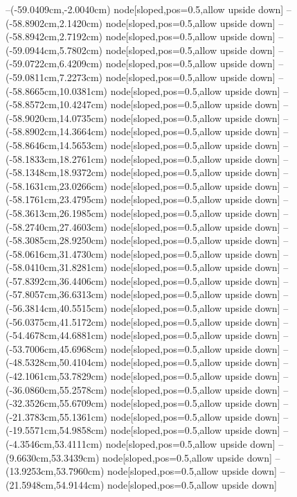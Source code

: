 --(-59.0409cm,-2.0040cm) node[sloped,pos=0.5,allow upside down]{\arrowIn}
--(-58.8902cm,2.1420cm) node[sloped,pos=0.5,allow upside down]{\ArrowIn}
--(-58.8942cm,2.7192cm) node[sloped,pos=0.5,allow upside down]{\arrowIn}
--(-59.0944cm,5.7802cm) node[sloped,pos=0.5,allow upside down]{\ArrowIn}
--(-59.0722cm,6.4209cm) node[sloped,pos=0.5,allow upside down]{\arrowIn}
--(-59.0811cm,7.2273cm) node[sloped,pos=0.5,allow upside down]{\arrowIn}
--(-58.8665cm,10.0381cm) node[sloped,pos=0.5,allow upside down]{\ArrowIn}
--(-58.8572cm,10.4247cm) node[sloped,pos=0.5,allow upside down]{\arrowIn}
--(-58.9020cm,14.0735cm) node[sloped,pos=0.5,allow upside down]{\ArrowIn}
--(-58.8902cm,14.3664cm) node[sloped,pos=0.5,allow upside down]{\arrowIn}
--(-58.8646cm,14.5653cm) node[sloped,pos=0.5,allow upside down]{\arrowIn}
--(-58.1833cm,18.2761cm) node[sloped,pos=0.5,allow upside down]{\ArrowIn}
--(-58.1348cm,18.9372cm) node[sloped,pos=0.5,allow upside down]{\arrowIn}
--(-58.1631cm,23.0266cm) node[sloped,pos=0.5,allow upside down]{\ArrowIn}
--(-58.1761cm,23.4795cm) node[sloped,pos=0.5,allow upside down]{\arrowIn}
--(-58.3613cm,26.1985cm) node[sloped,pos=0.5,allow upside down]{\ArrowIn}
--(-58.2740cm,27.4603cm) node[sloped,pos=0.5,allow upside down]{\ArrowIn}
--(-58.3085cm,28.9250cm) node[sloped,pos=0.5,allow upside down]{\ArrowIn}
--(-58.0616cm,31.4730cm) node[sloped,pos=0.5,allow upside down]{\ArrowIn}
--(-58.0410cm,31.8281cm) node[sloped,pos=0.5,allow upside down]{\arrowIn}
--(-57.8392cm,36.4406cm) node[sloped,pos=0.5,allow upside down]{\ArrowIn}
--(-57.8057cm,36.6313cm) node[sloped,pos=0.5,allow upside down]{\arrowIn}
--(-56.3814cm,40.5515cm) node[sloped,pos=0.5,allow upside down]{\ArrowIn}
--(-56.0375cm,41.5172cm) node[sloped,pos=0.5,allow upside down]{\ArrowIn}
--(-54.4678cm,44.6881cm) node[sloped,pos=0.5,allow upside down]{\ArrowIn}
--(-53.7006cm,45.6968cm) node[sloped,pos=0.5,allow upside down]{\ArrowIn}
--(-48.5328cm,50.4104cm) node[sloped,pos=0.5,allow upside down]{\ArrowIn}
--(-42.1061cm,53.7829cm) node[sloped,pos=0.5,allow upside down]{\ArrowIn}
--(-36.0860cm,55.2578cm) node[sloped,pos=0.5,allow upside down]{\ArrowIn}
--(-32.3526cm,55.6709cm) node[sloped,pos=0.5,allow upside down]{\ArrowIn}
--(-21.3783cm,55.1361cm) node[sloped,pos=0.5,allow upside down]{\ArrowIn}
--(-19.5571cm,54.9858cm) node[sloped,pos=0.5,allow upside down]{\ArrowIn}
--(-4.3546cm,53.4111cm) node[sloped,pos=0.5,allow upside down]{\ArrowIn}
--(9.6630cm,53.3439cm) node[sloped,pos=0.5,allow upside down]{\ArrowIn}
--(13.9253cm,53.7960cm) node[sloped,pos=0.5,allow upside down]{\ArrowIn}
--(21.5948cm,54.9144cm) node[sloped,pos=0.5,allow upside down]{\ArrowIn}
